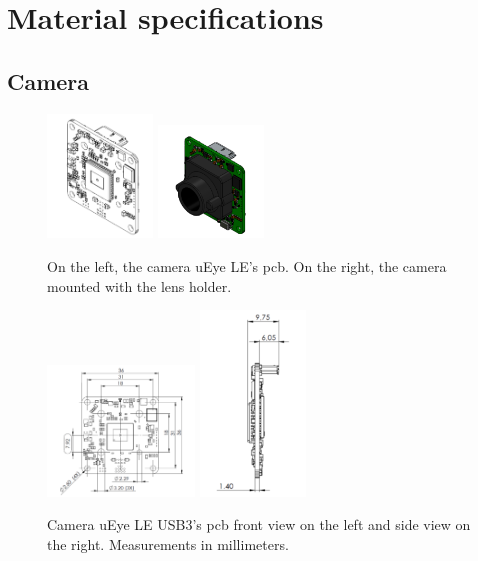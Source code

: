 \chapter{Material specifications}

\section{Camera}

\begin{figure}[ht]
	\centering
	\includegraphics[width=0.25\textwidth]{images/camview.png}
	\includegraphics[width=0.25\textwidth]{images/camwlens.png}
	\caption[Camera uEye LE USB3]{On the left, the camera uEye LE's \acrshort{pcb}. On the right, the camera mounted with the lens holder.}
	\label{appendix:cha2:camview}
\end{figure}

\begin{figure}[ht]
	\centering
	\includegraphics[width=0.35\textwidth]{images/camfronttview.png}
	\includegraphics[width=0.25\textwidth]{images/camsideview.png}
	\caption[Camera uEye LE USB3's \acrshort{pcb}]{Camera uEye LE USB3's \acrshort{pcb} front view on the left and side view on the right. Measurements in millimeters.}
	\label{appendix:cha2:camsides}
\end{figure}


